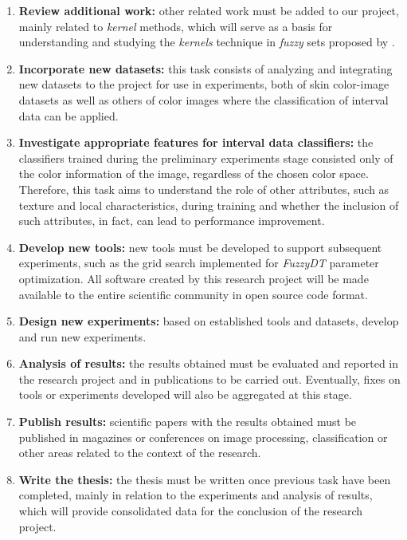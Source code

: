 \begin{enumerate}
    \item \textbf{Review additional work:} other related work must be added to our project, mainly related to \emph{kernel} methods, which will serve as a basis for understanding and studying the \emph{kernels} technique in \emph{fuzzy} sets proposed by \citet{guevara:14}.

    \item \textbf{Incorporate new datasets:} this task consists of analyzing and integrating new datasets to the project for use in experiments, both of skin color-image datasets as well as others of color images where the classification of interval data can be applied.

    \item \textbf{Investigate appropriate features for interval data classifiers:} the classifiers trained during the preliminary experiments stage consisted only of the color information of the image, regardless of the chosen color space. Therefore, this task aims to understand the role of other attributes, such as texture and local characteristics, during training and whether the inclusion of such attributes, in fact, can lead to performance improvement.

    \item \textbf{Develop new tools:} new tools must be developed to support subsequent experiments, such as the grid search implemented for \emph{FuzzyDT} parameter optimization. All software created by this research project will be made available to the entire scientific community in open source code format.

    \item \textbf{Design new experiments:} based on established tools and datasets, develop and run new experiments.

    \item \textbf{Analysis of results:} the results obtained must be evaluated and reported in the research project and in publications to be carried out. Eventually, fixes on tools or experiments developed will also be aggregated at this stage.

    \item \textbf{Publish results:} scientific papers with the results obtained must be published in magazines or conferences on image processing, classification or other areas related to the context of the research.

    \item \textbf{Write the thesis:} the thesis must be written once previous task have been completed, mainly in relation to the experiments and analysis of results, which will provide consolidated data for the conclusion of the research project.
\end{enumerate}


